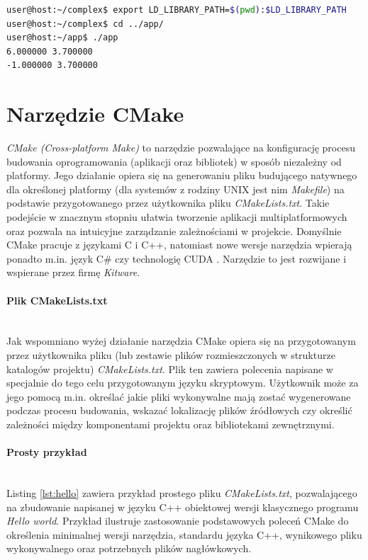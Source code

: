 \begin{lstlisting}[language=bash, style=Cmd, caption={Dodanie ścieżki zawierającej bibliotekę do zmiennej \textit{LD\_LIBRARY\_PATH} i poprawne uruchomienie przykładowej aplikacji}, label={lst:sharedOK}]
user@host:~/complex$ export LD_LIBRARY_PATH=$(pwd):$LD_LIBRARY_PATH
user@host:~/complex$ cd ../app/
user@host:~/app$ ./app
6.000000 3.700000
-1.000000 3.700000
\end{lstlisting}


\section{Narzędzie CMake}

\textit{CMake (Cross-platform Make)} to narzędzie pozwalające na konfigurację procesu budowania oprogramowania (aplikacji oraz bibliotek) w sposób niezależny od platformy. Jego działanie opiera się na generowaniu pliku budującego natywnego dla określonej platformy \cite{CMakeIntro} (dla systemów z rodziny UNIX jest nim \textit{Makefile}) na podstawie przygotowanego przez użytkownika pliku \textit{CMakeLists.txt}. Takie podejście w znacznym stopniu ułatwia tworzenie aplikacji multiplatformowych oraz pozwala na intuicyjne zarządzanie zależnościami w projekcie. Domyślnie CMake pracuje z językami C i C++, natomiast nowe wersje narzędzia wpierają ponadto m.in. język C\# czy technologię CUDA \cite{CMakeSupport}. Narzędzie to jest rozwijane i wspierane przez firmę \textit{Kitware}.\par

\paragraph*{Plik CMakeLists.txt}\mbox{} \\
Jak wspomniano wyżej działanie narzędzia CMake opiera się na przygotowanym przez użytkownika pliku (lub zestawie plików rozmieszczonych w strukturze katalogów projektu) \textit{CMakeLists.txt}. Plik ten zawiera polecenia napisane w specjalnie do tego celu przygotowanym języku skryptowym. Użytkownik może za jego pomocą  m.in. określać jakie pliki wykonywalne mają zostać wygenerowane podczas procesu budowania, wskazać lokalizację plików źródłowych czy określić zależności między komponentami projektu oraz bibliotekami zewnętrznymi. \par

\paragraph*{Prosty przykład}\mbox{} \\
Listing \ref{lst:hello} zawiera przykład prostego pliku \textit{CMakeLists.txt}, pozwalającego na zbudowanie napisanej w języku C++ obiektowej wersji klasycznego programu \textit{Hello world}. Przykład ilustruje zastosowanie podstawowych poleceń CMake do określenia minimalnej wersji narzędzia, standardu języka C++, wynikowego pliku wykonywalnego oraz potrzebnych plików nagłówkowych. \par


